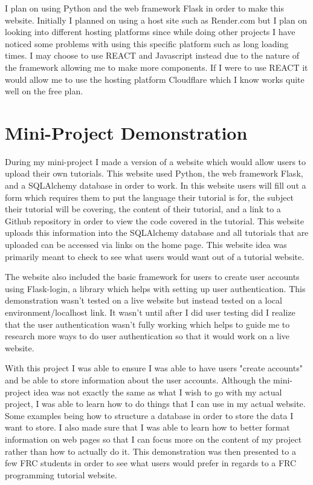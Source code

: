 \documentclass[10pt,twocolumn]{article}
\begin{document}
I plan on using Python and the web framework Flask in order to make this website. Initially I planned on using a host site such as Render.com but I plan on looking into different hosting platforms since while doing other projects I have noticed some problems with using this specific platform such as long loading times. I may choose to use REACT and Javascript instead due to the nature of the framework allowing me to make more components. If I were to use REACT it would allow me to use the hosting platform Cloudflare which I know works quite well on the free plan.

\section{Mini-Project Demonstration}

During my mini-project I made a version of a website which would allow users to upload their own tutorials. This website used Python, the web framework Flask, and a SQLAlchemy database in order to work. In this website users will fill out a form which requires them to put the language their tutorial is for, the subject their tutorial will be covering, the content of their tutorial, and a link to a Github repository in order to view the code covered in the tutorial. This website uploads this information into the SQLAlchemy database and all tutorials that are uploaded can be accessed via links on the home page. This website idea was primarily meant to check to see what users would want out of a tutorial website. 

The website also included the basic framework for users to create user accounts using Flask-login, a library which helps with setting up user authentication. This demonstration wasn't tested on a live website but instead tested on a local environment/localhost link. It wasn't until after I did user testing did I realize that the user authentication wasn't fully working which helps to guide me to research more ways to do user authentication so that it would work on a live website.

With this project I was able to ensure I was able to have users "create accounts" and be able to store information about the user accounts. Although the mini-project idea was not exactly the same as what I wish to go with my actual project, I was able to learn how to do things that I can use in my actual website. Some examples being how to structure a database in order to store the data I want to store. I also made sure that I was able to learn how to better format information on web pages so that I can focus more on the content of my project rather than how to actually do it. This demonstration was then presented to a few FRC students in order to see what users would prefer in regards to a FRC programming tutorial website.
\end{document}
